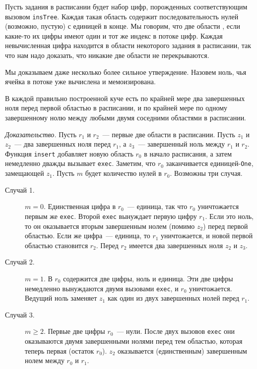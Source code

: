 Пусть  задания в расписании будет набор цифр,
порожденных соответствующим вызовом \lstinline!insTree!. Каждая такая
область содержит последовательность нулей (возможно, пустую) с единицей в
конце. Мы говорим, что две области , если
какие-то их цифры имеют один и тот же индекс в потоке цифр. Каждая
невычисленная цифра находится в области некоторого задания в
расписании, так что нам надо доказать, что никакие две области не
перекрываются.

Мы доказываем даже несколько более сильное утверждение. Назовем
 ноль, чья ячейка в потоке уже
вычислена и мемоизирована.

\begin{theorem}\label{th:7.1}
  В каждой правильно построенной куче есть по крайней мере два
  завершенных ноля перед первой областью в расписании, и по крайней
  мере по одному завершенному нолю между любыми двумя соседними
  областями в расписании.

  \emph{Доказательство.} Пусть $r_1$ и $r_2$~--- первые две области в
  расписании. Пусть $z_1$ и $z_2$~--- два завершенных ноля перед
  $r_1$, а $z_3$~--- завершенный ноль между $r_1$ и $r_2$. Функция
  \lstinline!insert! добавляет новую область $r_0$ в начало
  расписания, а затем немедленно дважды вызывает
  \lstinline!exec!. Заметим, что $r_0$ заканчивается
  единицей-\lstinline!One!, замещающей $z_1$. Пусть $m$ будет
  количество нулей в $r_0$. Возможны три случая.
  \begin{description}
  \item[Случай 1.] $m = 0$. Единственная цифра в $r_0$~--- единица, так
    что $r_0$ уничтожается первым же \lstinline!exec!. Второй
    \lstinline!exec! вынуждает первую цифру $r_1$. Если это ноль, то
    он оказывается вторым завершенным нолем (помимо $z_2$) перед
    первой областью. Если же цифра~--- единица, то $r_1$ уничтожается,
    и новой первой областью становится $r_2$.  Перед $r_2$ имеется два
    завершенных ноля $z_2$ и $z_3$.
  \item[Случай 2.] $m = 1$. В $r_0$ содержится две цифры, ноль и
    единица. Эти две цифры немедленно вынуждаются двумя вызовами
    \lstinline!exec!, и $r_0$ уничтожается. Ведущий ноль заменяет
    $z_1$ как один из двух завершенных нолей перед $r_1$.
  \item[Случай 3.] $m \ge 2$. Первые две цифры $r_0$~--- нули. После
    двух вызовов \lstinline!exec! они оказываются двумя завершенными
    нолями перед тем областью, которая теперь первая (остаток
    $r_0$). $z_2$ оказывается (единственным) завершенным нолем между
    $r_0$ и $r_1$.
  \end{description}
\end{theorem}

